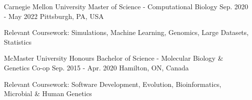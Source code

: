 \begin{cventries}
\vspace{-0.05in}
   \cventry
   {Carnegie Mellon University}
       {Master of Science - Computational Biology}
       {Sep. 2020 - May 2022}
       {Pittsburgh, PA, USA} %
       {\begin{cvitems}
          \item{Relevant Coursework: Simulations, Machine Learning, Genomics, Large Datasets, Statistics}
        \end{cvitems}
       }
   \cventry
       {McMaster University}
       {Honours Bachelor of Science - Molecular Biology \& Genetics Co-op}
       {Sep. 2015 - Apr. 2020}
       {Hamilton, ON, Canada} 
       {\begin{cvitems}
           \item{Relevant Coursework: Software Development, Evolution, Bioinformatics, Microbial \& Human Genetics}
        \end{cvitems}
       }
\end{cventries}
